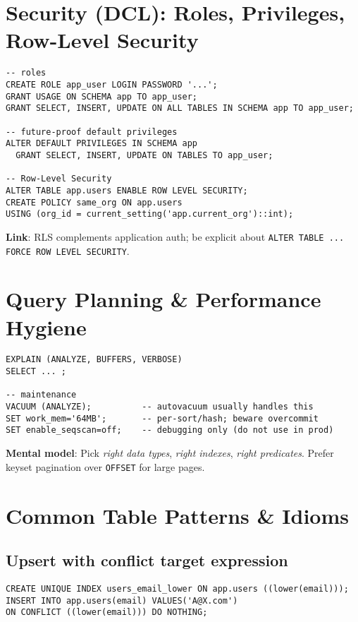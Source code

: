 \documentclass[10pt]{article}
\begin{document}
\section{Security (DCL): Roles, Privileges, Row-Level Security}
\begin{lstlisting}[style=psql]
-- roles
CREATE ROLE app_user LOGIN PASSWORD '...';
GRANT USAGE ON SCHEMA app TO app_user;
GRANT SELECT, INSERT, UPDATE ON ALL TABLES IN SCHEMA app TO app_user;

-- future-proof default privileges
ALTER DEFAULT PRIVILEGES IN SCHEMA app
  GRANT SELECT, INSERT, UPDATE ON TABLES TO app_user;

-- Row-Level Security
ALTER TABLE app.users ENABLE ROW LEVEL SECURITY;
CREATE POLICY same_org ON app.users
USING (org_id = current_setting('app.current_org')::int);
\end{lstlisting}
\textbf{Link}: RLS complements application auth; be explicit about \texttt{ALTER TABLE ... FORCE ROW LEVEL SECURITY}.

\section{Query Planning \& Performance Hygiene}
\begin{lstlisting}[style=psql]
EXPLAIN (ANALYZE, BUFFERS, VERBOSE)
SELECT ... ;

-- maintenance
VACUUM (ANALYZE);          -- autovacuum usually handles this
SET work_mem='64MB';       -- per-sort/hash; beware overcommit
SET enable_seqscan=off;    -- debugging only (do not use in prod)
\end{lstlisting}
\textbf{Mental model}: Pick \emph{right data types}, \emph{right indexes}, \emph{right predicates}. Prefer keyset pagination over \texttt{OFFSET} for large pages.

\section{Common Table Patterns \& Idioms}
\subsection{Upsert with conflict target expression}
\begin{lstlisting}[style=psql]
CREATE UNIQUE INDEX users_email_lower ON app.users ((lower(email)));
INSERT INTO app.users(email) VALUES('A@X.com')
ON CONFLICT ((lower(email))) DO NOTHING;
\end{lstlisting}
\end{document}
